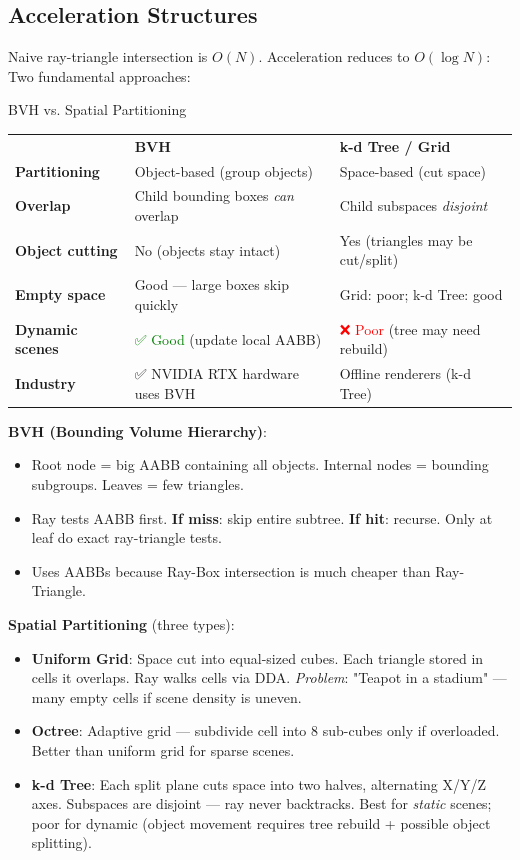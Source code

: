 \documentclass[11pt]{article}
\begin{document}
\subsection{Acceleration Structures}
Naive ray-triangle intersection is $O(N)$. Acceleration reduces to $O(\log N)$:
Two fundamental approaches:

\begin{formulabox}{BVH vs. Spatial Partitioning}
\begin{tabular}{>{\bfseries}p{2.5cm} p{4.5cm} p{4.5cm}}
& \textbf{BVH} & \textbf{k-d Tree / Grid} \\
Partitioning & Object-based (group objects) & Space-based (cut space) \\
Overlap & Child bounding boxes \textit{can} overlap & Child subspaces \textit{disjoint} \\
Object cutting & No (objects stay intact) & Yes (triangles may be cut/split) \\
Empty space & Good — large boxes skip quickly & Grid: poor; k-d Tree: good \\
Dynamic scenes & \textcolor{green}{✅ Good} (update local AABB) & \textcolor{red}{❌ Poor} (tree may need rebuild) \\
Industry & ✅ NVIDIA RTX hardware uses BVH & Offline renderers (k-d Tree) \\
\end{tabular}
\end{formulabox}

\textbf{BVH (Bounding Volume Hierarchy)}:
\begin{itemize}
    \item Root node = big AABB containing all objects. Internal nodes = bounding subgroups. Leaves = few triangles.
    \item Ray tests AABB first. \textbf{If miss}: skip entire subtree. \textbf{If hit}: recurse. Only at leaf do exact ray-triangle tests.
    \item Uses AABBs because Ray-Box intersection is much cheaper than Ray-Triangle.
\end{itemize}

\textbf{Spatial Partitioning} (three types):
\begin{itemize}
    \item \textbf{Uniform Grid}: Space cut into equal-sized cubes. Each triangle stored in cells it overlaps. Ray walks cells via DDA. \textit{Problem}: "Teapot in a stadium" — many empty cells if scene density is uneven.
    \item \textbf{Octree}: Adaptive grid — subdivide cell into 8 sub-cubes only if overloaded. Better than uniform grid for sparse scenes.
    \item \textbf{k-d Tree}: Each split plane cuts space into two halves, alternating X/Y/Z axes. Subspaces are disjoint — ray never backtracks. Best for \textit{static} scenes; poor for dynamic (object movement requires tree rebuild + possible object splitting).
\end{itemize}
\end{document}

